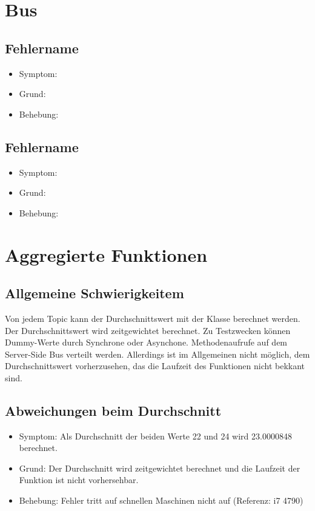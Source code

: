 \documentclass[qualitaetssicherung.tex]{subfiles}
\begin{document}
\section{Bus}

	\subsection{Fehlername}
		\begin{itemize}
			\item
			Symptom: 
			\item
			Grund:
			\item
			Behebung:
		\end{itemize}
		
	\subsection{Fehlername}
		\begin{itemize}
			\item
			Symptom:
			\item
			Grund:
			\item
			Behebung:
		\end{itemize}
		
\section{Aggregierte Funktionen}

	\subsection{Allgemeine Schwierigkeitem} 
		Von jedem Topic kann der Durchschnittswert mit der Klasse \label{Class: AverageComputation} berechnet werden. Der Durchschnittswert wird zeitgewichtet berechnet. Zu Testzwecken können Dummy-Werte durch Synchrone oder Asynchone. Methodenaufrufe auf dem Server-Side Bus verteilt werden. Allerdings ist im Allgemeinen nicht möglich, dem Durchschnittswert vorherzusehen, das die Laufzeit des Funktionen nicht bekkant sind.


	\subsection{Abweichungen beim Durchschnitt} \label{DAVG}
		\begin{itemize}
			\item
			Symptom: Als Durchschnitt der beiden Werte 22 und 24 wird 23.0000848 berechnet.
			\item
			Grund: Der Durchschnitt wird zeitgewichtet berechnet und die Laufzeit der Funktion ist nicht vorhersehbar.
			\item
			Behebung: Fehler tritt auf schnellen Maschinen nicht auf (Referenz: i7 4790)

		\end{itemize}
\end{document}
